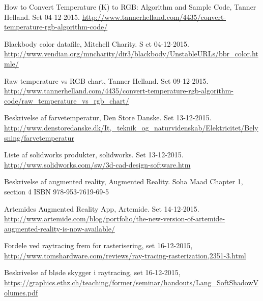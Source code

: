 \begin{thebibliography}{99}
  How to Convert Temperature (K) to RGB: Algorithm and   Sample Code,
  Tanner Helland.
  Set 04-12-2015.
  \url{http://www.tannerhelland.com/4435/convert-temperature-rgb-algorithm-code/}
  
  Blackbody color datafile, 
  Mitchell Charity. S
  et 04-12-2015.
  \url{http://www.vendian.org/mncharity/dir3/blackbody/UnstableURLs/bbr_color.htmle/}
  
  Raw temperature vs RGB chart,
  Tanner Helland. 
  Set 09-12-2015.
  \url{http://www.tannerhelland.com/4435/convert-temperature-rgb-algorithm-code/raw_temperature_vs_rgb_chart/}

  Beskrivelse af farvetemperatur, 
  Den Store Danske. 
  Set 13-12-2015.
  \url{http://www.denstoredanske.dk/It,_teknik_og_naturvidenskab/Elektricitet/Belysning/farvetemperatur}
  
  Liste af solidworks produkter, 
  solidworks. 
  Set 13-12-2015.
  \url{http://www.solidworks.com/sw/3d-cad-design-software.htm}

  Beskrivelse af augmented reality,
  Augmented Reality.
  Soha Maad
  Chapter 1, section 4
  ISBN 978-953-7619-69-5

  Artemides Augmented Reality App, 
  Artemide.
  Set 14-12-2015.
  \url{http://www.artemide.com/blog/portfolio/the-new-version-of-artemide-augmented-reality-is-now-available/}

  Fordele ved raytracing frem for rasterisering, set 16-12-2015,
  \url{http://www.tomshardware.com/reviews/ray-tracing-rasterization,2351-3.html}

  Beskrivelse af bløde skygger i raytracing, set 16-12-2015,
  \url{https://graphics.ethz.ch/teaching/former/seminar/handouts/Lang_SoftShadowVolumes.pdf}


  


  

  


  
\end{thebibliography}
\clearpage